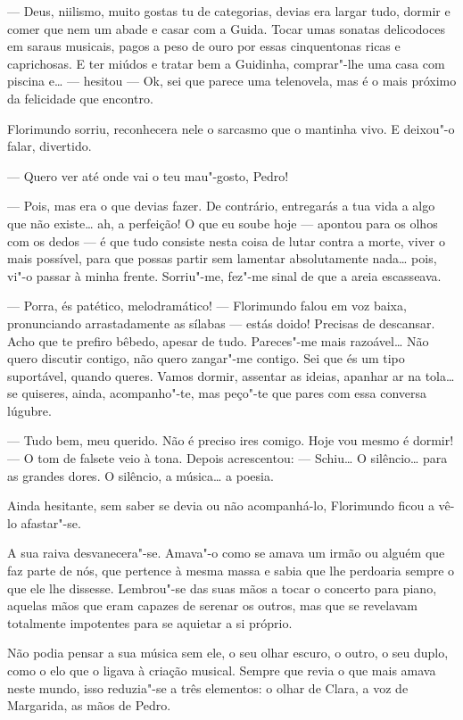 --- Deus, niilismo, muito gostas tu de categorias, devias era largar tudo,
dormir e comer que nem um abade e casar com a Guida. Tocar umas sonatas
delicodoces em saraus musicais, pagos a peso de ouro por essas
cinquentonas ricas e caprichosas. E ter miúdos e tratar bem a Guidinha,
comprar"-lhe uma casa com piscina e\ldots{} --- hesitou ---  Ok, sei que
parece uma telenovela, mas é o mais próximo da felicidade que encontro.

Florimundo sorriu, reconhecera nele o sarcasmo que o mantinha vivo. E
deixou"-o falar, divertido.

--- Quero ver até onde vai o teu mau"-gosto, Pedro!

--- Pois, mas era o que devias fazer. De contrário, entregarás a tua vida
a algo que não existe\ldots{} ah, a perfeição! O que eu soube hoje --- apontou
para os olhos com os dedos --- é que tudo consiste nesta coisa de lutar
contra a morte, viver o mais possível, para que possas partir sem
lamentar absolutamente nada\ldots{} pois, vi"-o passar à minha frente.
Sorriu"-me, fez"-me sinal de que a areia escasseava.

--- Porra, és patético, melodramático! --- Florimundo falou em voz baixa,
pronunciando arrastadamente as sílabas --- estás doido! Precisas de
descansar. Acho que te prefiro bêbedo, apesar de tudo. Pareces"-me mais
razoável\ldots{} Não quero discutir contigo, não quero zangar"-me contigo. Sei
que és um tipo suportável, quando queres. Vamos dormir, assentar as
ideias, apanhar ar na tola\ldots{} se quiseres, ainda, acompanho"-te, mas
peço"-te que pares com essa conversa lúgubre.

--- Tudo bem, meu querido. Não é preciso ires comigo. Hoje vou mesmo é
dormir! --- O tom de falsete veio à tona. Depois acrescentou: --- Schiu\ldots{} O
silêncio\ldots{} para as grandes dores. O silêncio, a música\ldots{} a poesia.

Ainda hesitante, sem saber se devia ou não acompanhá-lo, Florimundo
ficou a vê-lo afastar"-se.

A sua raiva desvanecera"-se. Amava"-o como se amava um irmão ou alguém que
faz parte de nós, que pertence à mesma massa e sabia que lhe perdoaria
sempre o que ele lhe dissesse. Lembrou"-se das suas mãos a tocar o
concerto para piano, aquelas mãos que eram capazes de serenar os outros,
mas que se revelavam totalmente impotentes para se aquietar a si
próprio.

Não podia pensar a sua música sem ele, o seu olhar escuro, o outro, o
seu duplo, como o elo que o ligava à criação musical. Sempre que revia o
que mais amava neste mundo, isso reduzia"-se a três elementos: o olhar de
Clara, a voz de Margarida, as mãos de Pedro.

